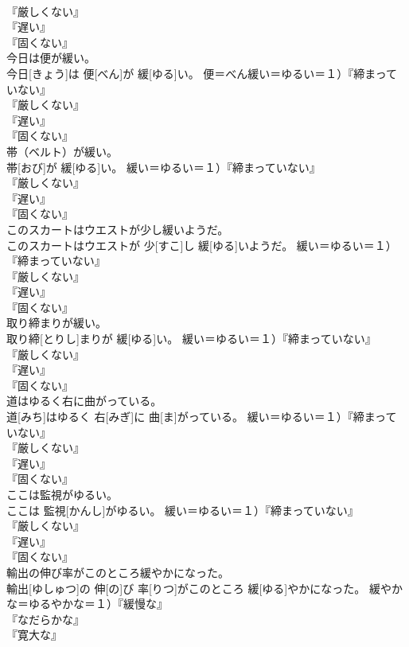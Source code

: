\documentclass[8pt]{extreport}
\begin{document}
\begin{CJK}{UTF8}{min}
{\\	『厳しくない』
\\	『遅い』
\\	『固くない』
\\	今日は便が緩い。	
\\	今日[きょう]は 便[べん]が 緩[ゆる]い。	便＝べん緩い＝ゆるい＝１）『締まっていない』
\\	『厳しくない』
\\	『遅い』
\\	『固くない』
\\	帯（ベルト）が緩い。	
\\	帯[おび]が 緩[ゆる]い。	緩い＝ゆるい＝１）『締まっていない』
\\	『厳しくない』
\\	『遅い』
\\	『固くない』
\\	このスカートはウエストが少し緩いようだ。	
\\	このスカートはウエストが 少[すこ]し 緩[ゆる]いようだ。	緩い＝ゆるい＝１）『締まっていない』
\\	『厳しくない』
\\	『遅い』
\\	『固くない』
\\	取り締まりが緩い。	
\\	取り締[とりし]まりが 緩[ゆる]い。	緩い＝ゆるい＝１）『締まっていない』
\\	『厳しくない』
\\	『遅い』
\\	『固くない』
\\	道はゆるく右に曲がっている。	
\\	道[みち]はゆるく 右[みぎ]に 曲[ま]がっている。	緩い＝ゆるい＝１）『締まっていない』
\\	『厳しくない』
\\	『遅い』
\\	『固くない』
\\	ここは監視がゆるい。	
\\	ここは 監視[かんし]がゆるい。	緩い＝ゆるい＝１）『締まっていない』
\\	『厳しくない』
\\	『遅い』
\\	『固くない』
\\	輸出の伸び率がこのところ緩やかになった。	
\\	輸出[ゆしゅつ]の 伸[の]び 率[りつ]がこのところ 緩[ゆる]やかになった。	緩やかな＝ゆるやかな＝１）『緩慢な』
\\	『なだらかな』
\\	『寛大な』
}
\end{CJK}
\end{document}
